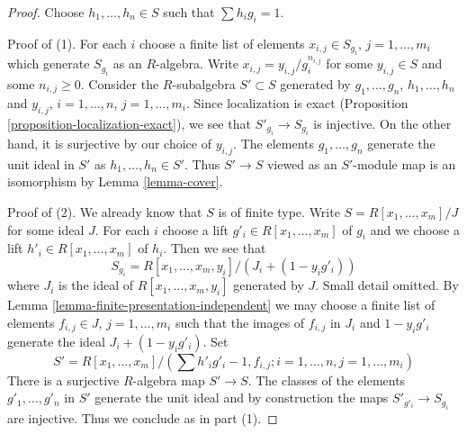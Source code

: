 \begin{proof}
Choose $h_1, \ldots, h_n \in S$ such that $\sum h_i g_i = 1$.

\medskip\noindent
Proof of (1). For each $i$ choose a finite list of elements
$x_{i, j} \in S_{g_i}$, $j = 1, \ldots, m_i$
which generate $S_{g_i}$ as an $R$-algebra.
Write $x_{i, j} = y_{i, j}/g_i^{n_{i, j}}$ for some $y_{i, j} \in S$ and
some $n_{i, j} \ge 0$. Consider the $R$-subalgebra $S' \subset S$
generated by $g_1, \ldots, g_n$, $h_1, \ldots, h_n$ and
$y_{i, j}$, $i = 1, \ldots, n$, $j = 1, \ldots, m_i$.
Since localization is exact (Proposition \ref{proposition-localization-exact}),
we see that $S'_{g_i} \to S_{g_i}$ is injective.
On the other hand, it is surjective by our choice of $y_{i, j}$.
The elements $g_1, \ldots, g_n$ generate the unit ideal in $S'$
as $h_1, \ldots, h_n \in S'$.
Thus $S' \to S$ viewed as an $S'$-module map is an isomorphism
by Lemma \ref{lemma-cover}.

\medskip\noindent
Proof of (2). We already know that $S$ is of finite type.
Write $S = R[x_1, \ldots, x_m]/J$ for some ideal $J$.
For each $i$ choose a lift $g'_i \in R[x_1, \ldots, x_m]$ of $g_i$
and we choose a lift $h'_i \in R[x_1, \ldots, x_m]$ of $h_i$.
Then we see that
$$
S_{g_i} = R[x_1, \ldots, x_m, y_i]/(J_i + (1 - y_ig'_i))
$$
where $J_i$ is the ideal of $R[x_1, \ldots, x_m, y_i]$
generated by $J$. Small detail omitted. By
Lemma \ref{lemma-finite-presentation-independent}
we may choose a finite list of elements
$f_{i, j} \in J$, $j = 1, \ldots, m_i$
such that the images of $f_{i, j}$ in $J_i$ and $1 - y_ig'_i$
generate the ideal $J_i + (1 - y_ig'_i)$.
Set
$$
S' = R[x_1, \ldots, x_m]/\left(\sum h'_ig'_i - 1, f_{i, j}; 
i = 1, \ldots, n, j = 1, \ldots, m_i\right)
$$
There is a surjective $R$-algebra map $S' \to S$.
The classes of the elements $g'_1, \ldots, g'_n$ in $S'$
generate the unit ideal and by construction the maps
$S'_{g'_i} \to S_{g_i}$ are injective.
Thus we conclude as in part (1).
\end{proof}





